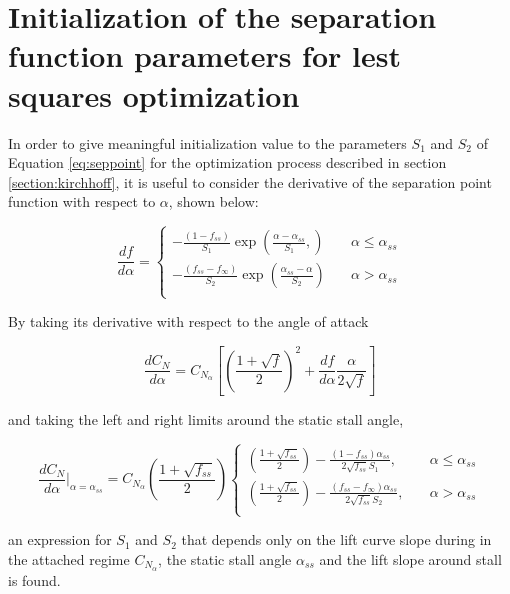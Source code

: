 \section{Initialization of the separation function parameters for lest squares optimization}


In order to give meaningful initialization value to the parameters $S_1$ and $S_2$ of Equation \eqref{eq:seppoint} for the optimization process described in section \ref{section:kirchhoff}, it is useful to consider the derivative of the separation point function with respect to $\alpha$, shown below:

\begin{equation} 
\frac{df}{d\alpha} = 
     \begin{cases}
       -\frac{(1-f_{ss})}{S_1}\exp(\frac{\alpha-\alpha_{ss}}{S_1},) &\quad \alpha \leq \alpha_{ss}\\
        -\frac{(f_{ss}-f_\infty)}{S_2}\exp(\frac{\alpha_{ss}-\alpha}{S_2}) &\quad \alpha > \alpha_{ss}\\
     \end{cases}
\end{equation}

By taking its derivative with respect to the angle of attack

\begin{equation}
\frac{dC_N}{d\alpha} = C_{N_{\alpha}} \left[\left(\frac{1+\sqrt{f}}{2}\right)^2+\frac{df}{d\alpha} \frac{\alpha}{2\sqrt{f}} \right]
\end{equation}

\noindent and taking the left and right limits around the static stall angle,

\begin{equation}
\frac{dC_N}{d\alpha}\Big|_{\alpha=\alpha_{ss}} = C_{N_\alpha}\left(\frac{1+\sqrt{f_{ss}}}{2}\right)
     \begin{cases}
      \left(\frac{1+\sqrt{f_{ss}}}{2}\right)-\frac{(1-f_{ss})\alpha_{ss}}{2\sqrt{f_{ss}}S_1},&\quad \alpha \leq \alpha_{ss}\\
        \left(\frac{1+\sqrt{f_{ss}}}{2}\right)-\frac{(f_{ss}-f_\infty)\alpha_{ss}}{2\sqrt{f_{ss}}S_2}, &\quad \alpha > \alpha_{ss}\\
     \end{cases}
\end{equation}

\noindent an expression for $S_1$ and $S_2$ that depends only on the lift curve slope during in the attached regime $C_{N_\alpha}$, the static stall angle $\alpha_{ss}$ and the lift slope around stall is found.


